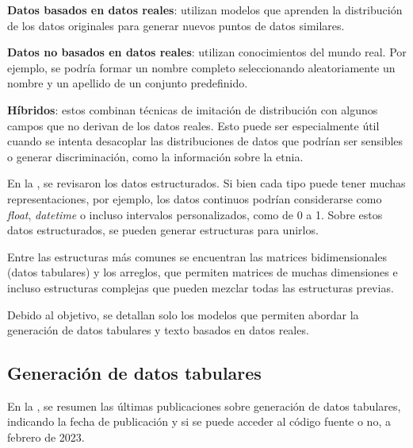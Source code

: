 \textbf{Datos basados en datos reales}: utilizan modelos que aprenden la distribución de los datos originales para generar nuevos puntos de datos similares.

\textbf{Datos no basados en datos reales}: utilizan conocimientos del mundo real. Por ejemplo, se podría formar un nombre completo seleccionando aleatoriamente un nombre y un apellido de un conjunto predefinido.

\textbf{Híbridos}: estos combinan técnicas de imitación de distribución con algunos campos que no derivan de los datos reales. Esto puede ser especialmente útil cuando se intenta desacoplar las distribuciones de datos que podrían ser sensibles o generar discriminación, como la información sobre la etnia.

En la , se revisaron los datos estructurados. Si bien cada tipo puede tener muchas representaciones, por ejemplo, los datos continuos podrían considerarse como \emph{float}, \emph{datetime} o incluso intervalos personalizados, como de 0 a 1. Sobre estos datos estructurados, se pueden generar estructuras para unirlos.

Entre las estructuras más comunes se encuentran las matrices bidimensionales (datos tabulares) y los arreglos, que permiten matrices de muchas dimensiones e incluso estructuras complejas que pueden mezclar todas las estructuras previas.

Debido al objetivo, se detallan solo los modelos que permiten abordar la generación de datos tabulares y texto basados en datos reales.
\newpage
\subsection{Generación de datos tabulares}
En la , se resumen las últimas publicaciones sobre generación de datos tabulares, indicando la fecha de publicación y si se puede acceder al código fuente o no, a febrero de 2023.

